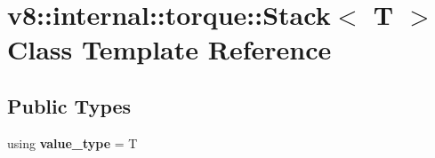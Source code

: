 \hypertarget{classv8_1_1internal_1_1torque_1_1Stack}{}\section{v8\+:\+:internal\+:\+:torque\+:\+:Stack$<$ T $>$ Class Template Reference}
\label{classv8_1_1internal_1_1torque_1_1Stack}
\subsection*{Public Types}
\begin{DoxyCompactItemize}
\item 
\mbox{\label{classv8_1_1internal_1_1torque_1_1Stack_ae093aa30ef46c7fad02457ad9d5f4912}} 
using {\bfseries value\+\_\+type} = T
\end{DoxyCompactItemize}
